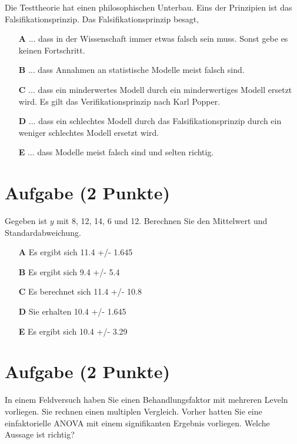 \documentclass[a4paper, 9pt]{scrartcl}\usepackage[]{graphicx}\usepackage[]{xcolor}
\begin{document}
Die Testtheorie hat einen philosophischen Unterbau. Eins der Prinzipien ist das Falsifikationsprinzip. Das Falsifikationsprinzip besagt,



\begin{enumerate}
\item [\textbf{A} \msquare] ... dass in der Wissenschaft immer etwas falsch sein muss. Sonst gebe es keinen Fortschritt.
\item [\textbf{B} \msquare] ... dass Annahmen an statistische Modelle meist falsch sind.
\item [\textbf{C} \msquare] ... dass ein minderwertes Modell durch ein minderwertiges Modell ersetzt wird. Es gilt das Verifikationsprinzip nach Karl Popper.
\item [\textbf{D} \msquare] ... dass ein schlechtes Modell durch das Falsifikationsprinzip durch ein weniger schlechtes Modell ersetzt wird.
\item [\textbf{E} \msquare] ... dass Modelle meist falsch sind und selten richtig.
\end{enumerate} 

\section{Aufgabe \hfill (2 Punkte)}




Gegeben ist $y$ mit 8, 12, 14, 6 und 12. Berechnen Sie den Mittelwert und Standardabweichung.



\begin{enumerate}
\item [\textbf{A} \msquare] Es ergibt sich 11.4 +/- 1.645
\item [\textbf{B} \msquare] Es ergibt sich 9.4 +/- 5.4
\item [\textbf{C} \msquare] Es berechnet sich 11.4 +/- 10.8
\item [\textbf{D} \msquare] Sie erhalten 10.4 +/- 1.645
\item [\textbf{E} \msquare] Es ergibt sich 10.4 +/- 3.29
\end{enumerate} 

\section{Aufgabe \hfill (2 Punkte)}




In einem Feldversuch haben Sie einen Behandlungsfaktor mit mehreren Leveln vorliegen. Sie rechnen einen multiplen Vergleich. Vorher hatten Sie eine einfaktorielle ANOVA mit einem signifikanten Ergebnis vorliegen. Welche Aussage ist richtig?
\end{document}
